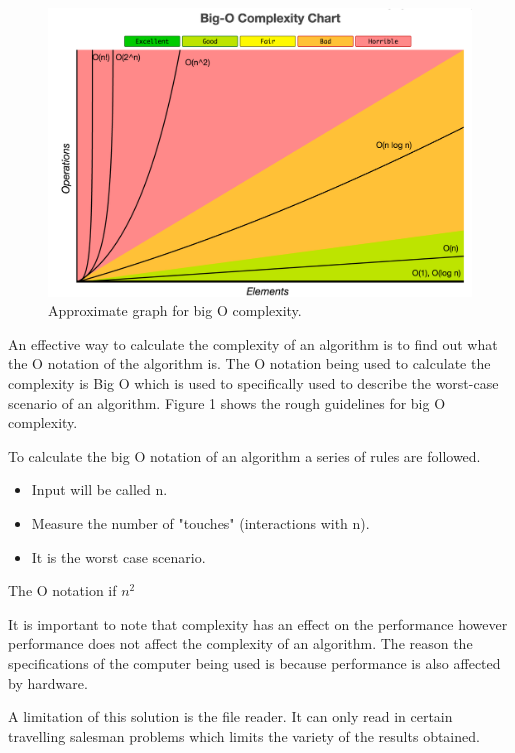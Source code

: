 \documentclass[conference,backref=page]{acmsiggraph}
\begin{document}
\begin{figure}[h]
	\includegraphics[width=\columnwidth]{images/OCheatSheet.png}
	\caption{Approximate graph for big O complexity.}
	\label{O}
\end{figure}
An effective way to calculate the complexity of an algorithm is to find out what the O notation of the algorithm is. The O notation being used to calculate the complexity is Big O which is used to specifically used to describe the worst-case scenario of an algorithm. 
Figure 1 shows the rough guidelines for big O complexity. 

To calculate the big O notation of an algorithm a series of rules are followed.
\begin{itemize}
	\item Input will be called n.
	\item Measure the number of "touches" (interactions with n).
	\item It is the worst case scenario.
	
\end{itemize}

The O notation if \begin{math}{n^2} \end{math}



It is important to note that complexity has an effect on the performance however performance does not affect the complexity of an algorithm. The reason the specifications of the computer being used is because performance is also affected by hardware.

A limitation of this solution is the file reader. It can only read in certain travelling salesman problems which limits the variety of the results obtained. 
\end{document}
